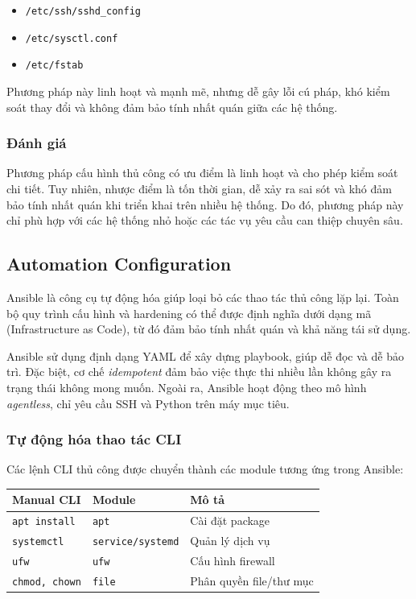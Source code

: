 \begin{itemize}
\item \texttt{/etc/ssh/sshd\_config}
\item \texttt{/etc/sysctl.conf}
\item \texttt{/etc/fstab}
\end{itemize}

\noindent Phương pháp này linh hoạt và mạnh mẽ, nhưng dễ gây lỗi cú pháp, khó kiểm soát thay đổi và không đảm bảo tính nhất quán giữa các hệ thống.

\subsubsection{Đánh giá}

\noindent Phương pháp cấu hình thủ công có ưu điểm là linh hoạt và cho phép kiểm soát chi tiết. Tuy nhiên, nhược điểm là tốn thời gian, dễ xảy ra sai sót và khó đảm bảo tính nhất quán khi triển khai trên nhiều hệ thống. Do đó, phương pháp này chỉ phù hợp với các hệ thống nhỏ hoặc các tác vụ yêu cầu can thiệp chuyên sâu.


\subsection{Automation Configuration}

\noindent Ansible là công cụ tự động hóa giúp loại bỏ các thao tác thủ công lặp lại. Toàn bộ quy trình cấu hình và hardening có thể được định nghĩa dưới dạng mã (Infrastructure as Code), từ đó đảm bảo tính nhất quán và khả năng tái sử dụng.

\noindent Ansible sử dụng định dạng YAML để xây dựng playbook, giúp dễ đọc và dễ bảo trì. Đặc biệt, cơ chế \textit{idempotent} đảm bảo việc thực thi nhiều lần không gây ra trạng thái không mong muốn. Ngoài ra, Ansible hoạt động theo mô hình \textit{agentless}, chỉ yêu cầu SSH và Python trên máy mục tiêu.

\subsubsection{Tự động hóa thao tác CLI}

\noindent Các lệnh CLI thủ công được chuyển thành các module tương ứng trong Ansible:

\begin{center}
\begin{tabular}{|l|l|l|}
\hline
\textbf{Manual CLI} & \textbf{Module} & \textbf{Mô tả} \\
\hline
\texttt{apt install} & \texttt{apt} & Cài đặt package \\
\texttt{systemctl} & \texttt{service/systemd} & Quản lý dịch vụ \\
\texttt{ufw} & \texttt{ufw} & Cấu hình firewall \\
\texttt{chmod, chown} & \texttt{file} & Phân quyền file/thư mục \\
\hline
\end{tabular}
\end{center}

